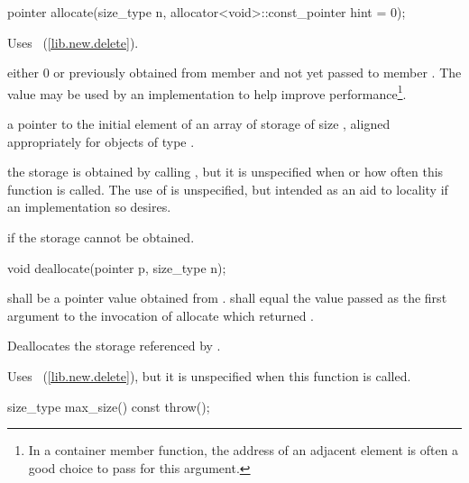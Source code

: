 \begin{itemdecl}
pointer allocate(size_type n, allocator<void>::const_pointer hint = 0);
\end{itemdecl}

\begin{itemdescr}
\pnum
\notes
Uses ~(\ref{lib.new.delete}).

\pnum
\requires
{} either 0 or previously obtained from member 
and not yet passed to member . The value 
may be used by an implementation to help improve performance\footnote{In a
container member function, the address of an adjacent element is often a
good choice to pass for this argument.}.

\pnum
\returns
a pointer to the initial element of an array of storage of size 
, aligned appropriately for objects of type .

\pnum
\note
the storage is obtained by calling , but it is unspecified when or how often this
function is called. The use of  is unspecified, but intended as an aid to
locality if an implementation so desires.

\pnum
\throws
{} if the storage cannot be obtained.
\end{itemdescr}

\begin{itemdecl}
void deallocate(pointer p, size_type n);
\end{itemdecl}

\begin{itemdescr}
\pnum
\requires
{} shall be a pointer value obtained from .
 shall equal the value passed as the first argument
to the invocation of allocate which returned .

\pnum
\effects
Deallocates the storage referenced by  .

\pnum
\notes
Uses
~(\ref{lib.new.delete}), but it is unspecified when this function is called.
\end{itemdescr}

\begin{itemdecl}
size_type max_size() const throw();
\end{itemdecl}

